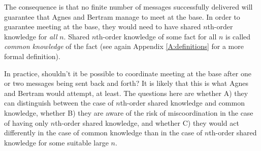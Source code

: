 The consequence is that no finite number of messages successfully delivered will guarantee that Agnes and Bertram manage to meet at the base. In order to guarantee meeting at the base, they would need to have shared $n$th-order knowledge for \emph{all} $n$. Shared $n$th-order knowledge of some fact for all $n$ is called  \emph{common knowledge} of the fact (see again  %
Appendix \ref{A:definitions} for a more formal definition). %

In practice, shouldn't it be possible to coordinate meeting at the base after one or two messages being sent back and forth? It is likely that this is what Agnes and Bertram would attempt, at least. The questions here are whether 
A) they can distinguish between the case of $n$th-order shared knowledge and common knowledge, whether B) they are aware of the risk of miscoordination in the case of having only $n$th-order shared knowledge, and whether C) they would act differently in the case of common knowledge than in the case of $n$th-order shared knowledge for some suitable large $n$. 


